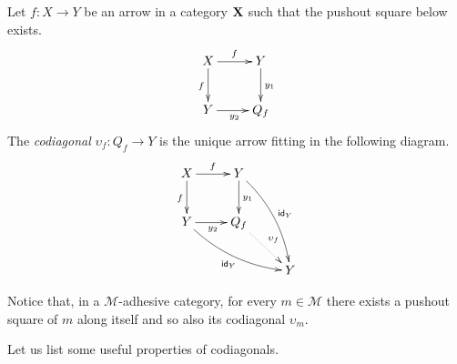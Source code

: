 \begin{definition} 
	Let $f\colon X\to Y$ be an arrow in a category $\textbf {\textup{X}}$ such that the pushout square below  exists.
	\[\xymatrix{ X \ar[r]^f \ar[d]_f& Y \ar[d]^{y_1}\\ Y \ar[r]_{y_2} & Q_f}\]
	The \emph{codiagonal} $\upsilon_f\colon Q_f\to Y$ is the unique arrow  fitting in the following diagram.
	\[\xymatrix{ X \ar[r]^f \ar[d]_f& Y \ar@/^.3cm/[ddr]^{\id{Y}} \ar[d]^{y_1}\\ Y \ar@/_.3cm/[drr]_{\id{Y}}\ar[r]_{y_2} & Q_f \ar@{.>}[dr]^{\upsilon_f}\\ && Y}\]
\end{definition}

\begin{remark}\label{rem:cod}
	Notice that, in a  $\mathcal{M}$-adhesive category,  for every $m\in \mathcal{M}$ there exists a pushout square of $m$ along itself and so also its codiagonal $\upsilon_m$.
\end{remark}

Let us list some useful properties of codiagonals.

